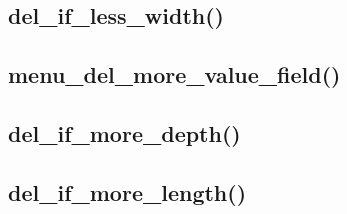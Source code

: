 \documentclass[12pt, a4paper]{article}
\begin{document}






\subsection{del\_if\_less\_width()}






\subsection{menu\_del\_more\_value\_field()}







\subsection{del\_if\_more\_depth()}







\subsection{del\_if\_more\_length()}
\end{document}
